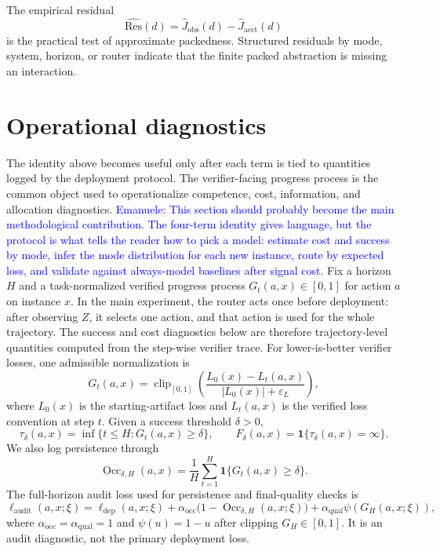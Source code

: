 \documentclass{article}
\DeclareMathOperator{\Occ}{Occ}
\newcommand{\eps}{\varepsilon}
\newcommand{\one}{\mathbf{1}}
\begin{document}
The empirical residual
\[
    \widehat{\mathrm{Res}}(d)
    =
    \widehat J_{\mathrm{obs}}(d)-\widehat J_{\mathrm{acct}}(d)
\]
is the practical test of approximate packedness.  Structured residuals by mode, system,
horizon, or router indicate that the finite packed abstraction is missing an interaction.


\section{Operational diagnostics}
\label{subsec:bridge}

The identity above becomes useful only after each term is tied to quantities logged by the deployment protocol.
The verifier-facing progress process is the common object used to operationalize competence, cost, information, and allocation diagnostics.
\textcolor{blue}{Emanuele: This section should probably become the main methodological contribution. The four-term identity gives language, but the protocol is what tells the reader how to pick a model: estimate cost and success by mode, infer the mode distribution for each new instance, route by expected loss, and validate against always-model baselines after signal cost.}
Fix a horizon $H$ and a task-normalized verified progress process $G_t(a,x)\in[0,1]$ for action $a$ on instance $x$.
In the main experiment, the router acts once before deployment: after observing $Z$, it selects one action, and that action is used for the whole trajectory.
The success and cost diagnostics below are therefore trajectory-level quantities computed from the step-wise verifier trace.
For lower-is-better verifier losses, one admissible normalization is
\[
G_t(a,x)
=
\operatorname{clip}_{[0,1]}\!\left(
\frac{L_0(x)-L_t(a,x)}{|L_0(x)|+\eps_L}
\right),
\]
where $L_0(x)$ is the starting-artifact loss and $L_t(a,x)$ is the verified loss convention at step $t$.
Given a success threshold $\delta>0$,
\[
\tau_\delta(a,x)=\inf\{t\le H:G_t(a,x)\ge \delta\},
\qquad
F_\delta(a,x)=\one\{\tau_\delta(a,x)=\infty\}.
\]
We also log persistence through
\[
\Occ_{\delta,H}(a,x)=\frac{1}{H}\sum_{t=1}^H \one\{G_t(a,x)\ge \delta\}.
\]
The full-horizon audit loss used for persistence and final-quality checks is
\begin{equation}
\ell_{\mathrm{audit}}(a,x;\xi)
=
\ell_{\mathrm{dep}}(a,x;\xi)
+\alpha_{\mathrm{occ}}\bigl(1-\Occ_{\delta,H}(a,x;\xi)\bigr)
+\alpha_{\mathrm{qual}}\psi(G_H(a,x;\xi)),
\label{eq:audit-loss}
\end{equation}
where \(\alpha_{\mathrm{occ}}=\alpha_{\mathrm{qual}}=1\) and \(\psi(u)=1-u\) after clipping \(G_H\in[0,1]\).
It is an audit diagnostic, not the primary deployment loss.
\end{document}
